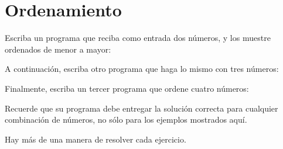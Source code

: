 \section{Ordenamiento}

Escriba un programa que reciba como entrada dos números, y los muestre
ordenados de menor a mayor:

A continuación, escriba otro programa que haga lo mismo con tres
números:

Finalmente, escriba un tercer programa que ordene cuatro números:

Recuerde que su programa debe entregar la solución correcta para
cualquier combinación de números, no sólo para los ejemplos mostrados
aquí.

Hay más de una manera de resolver cada ejercicio.
